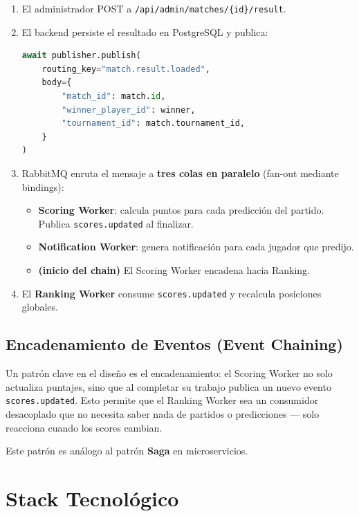 \documentclass[12pt,a4paper]{article}
\newcommand{\code}[1]{\texttt{\small\color{navy}#1}}
\newcommand{\event}[1]{\texttt{\small\color{accent}#1}}
\begin{document}
\begin{enumerate}
  \item El administrador POST a \code{/api/admin/matches/\{id\}/result}.
  \item El backend persiste el resultado en PostgreSQL y publica:
    \begin{lstlisting}[language=Python, caption=Publicación del evento]
await publisher.publish(
    routing_key="match.result.loaded",
    body={
        "match_id": match.id,
        "winner_player_id": winner,
        "tournament_id": match.tournament_id,
    }
)
    \end{lstlisting}
  \item RabbitMQ enruta el mensaje a \textbf{tres colas en paralelo} (fan-out mediante bindings):
    \begin{itemize}
      \item \textbf{Scoring Worker}: calcula puntos para cada predicción del partido.
        Publica \event{scores.updated} al finalizar.
      \item \textbf{Notification Worker}: genera notificación para cada jugador que predijo.
      \item \textbf{(inicio del chain)} El Scoring Worker encadena hacia Ranking.
    \end{itemize}
  \item El \textbf{Ranking Worker} consume \event{scores.updated} y recalcula posiciones globales.
\end{enumerate}

\subsection{Encadenamiento de Eventos (Event Chaining)}

Un patrón clave en el diseño es el encadenamiento: el Scoring Worker no solo actualiza puntajes,
sino que al completar su trabajo publica un nuevo evento \event{scores.updated}. Esto permite
que el Ranking Worker sea un consumidor desacoplado que no necesita saber nada de partidos o
predicciones — solo reacciona cuando los scores cambian.

Este patrón es análogo al patrón \textbf{Saga} en microservicios.

\section{Stack Tecnológico}
\end{document}
